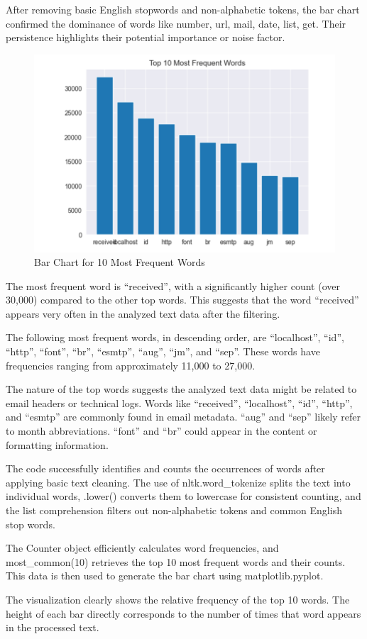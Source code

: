 After removing basic English stopwords and non-alphabetic tokens, the bar chart confirmed the dominance of words like number, url, mail, date, list, get.
Their persistence highlights their potential importance or noise factor.

\begin{figure}[H]
    \centering
    \includegraphics[width=\linewidth]{images/frequent_words}
    \caption{Bar Chart for 10 Most Frequent Words}
    \label{fig:frequent_words}
\end{figure}

The most frequent word is ``received'', with a significantly higher count (over 30,000) compared to the other top words.
This suggests that the word ``received'' appears very often in the analyzed text data after the filtering.

The following most frequent words, in descending order, are ``localhost'', ``id'', ``http'', ``font'', ``br'', ``esmtp'', ``aug'', ``jm'', and ``sep''.
These words have frequencies ranging from approximately 11,000 to 27,000.

The nature of the top words suggests the analyzed text data might be related to email headers or technical logs.
Words like ``received'', ``localhost'', ``id'', ``http'', and ``esmtp'' are commonly found in email metadata.
``aug'' and ``sep'' likely refer to month abbreviations.
``font'' and ``br'' could appear in the content or formatting information.

The code successfully identifies and counts the occurrences of words after applying basic text cleaning.
The use of nltk.word\_tokenize splits the text into individual words, .lower() converts them to lowercase for consistent counting, and the list comprehension filters out non-alphabetic tokens and common English stop words.

The Counter object efficiently calculates word frequencies, and most\_common(10) retrieves the top 10 most frequent words and their counts.
This data is then used to generate the bar chart using matplotlib.pyplot.

The visualization clearly shows the relative frequency of the top 10 words.
The height of each bar directly corresponds to the number of times that word appears in the processed text.
